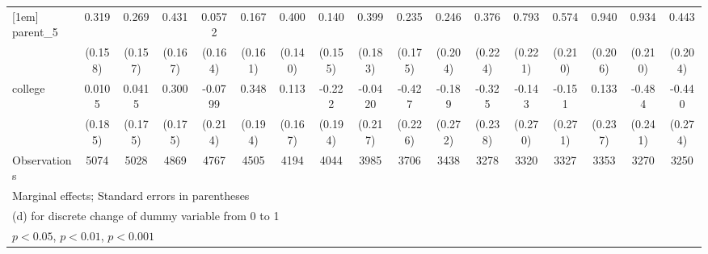 {\begin{tabular}{l*{16}{c}}
[1em]
parent\_5            &       0.319\sym{*}  &       0.269         &       0.431\sym{**} &      0.0572         &       0.167         &       0.400\sym{**} &       0.140         &       0.399\sym{*}  &       0.235         &       0.246         &       0.376         &       0.793\sym{***}&       0.574\sym{**} &       0.940\sym{***}&       0.934\sym{***}&       0.443\sym{*}  \\
                    &     (0.158)         &     (0.157)         &     (0.167)         &     (0.164)         &     (0.161)         &     (0.140)         &     (0.155)         &     (0.183)         &     (0.175)         &     (0.204)         &     (0.224)         &     (0.221)         &     (0.210)         &     (0.206)         &     (0.210)         &     (0.204)         \\
[1em]
college             &      0.0105         &      0.0415         &       0.300         &     -0.0799         &       0.348         &       0.113         &      -0.222         &     -0.0420         &      -0.427         &      -0.189         &      -0.325         &      -0.143         &      -0.151         &       0.133         &      -0.484\sym{*}  &      -0.440         \\
                    &     (0.185)         &     (0.175)         &     (0.175)         &     (0.214)         &     (0.194)         &     (0.167)         &     (0.194)         &     (0.217)         &     (0.226)         &     (0.272)         &     (0.238)         &     (0.270)         &     (0.271)         &     (0.237)         &     (0.241)         &     (0.274)         \\
\hline
Observations        &        5074         &        5028         &        4869         &        4767         &        4505         &        4194         &        4044         &        3985         &        3706         &        3438         &        3278         &        3320         &        3327         &        3353         &        3270         &        3250         \\
\hline\hline
\multicolumn{17}{l}{\footnotesize Marginal effects; Standard errors in parentheses}\\
\multicolumn{17}{l}{\footnotesize  (d) for discrete change of dummy variable from 0 to 1}\\
\multicolumn{17}{l}{\footnotesize \sym{*} \(p<0.05\), \sym{**} \(p<0.01\), \sym{***} \(p<0.001\)}\\
\end{tabular}
}
